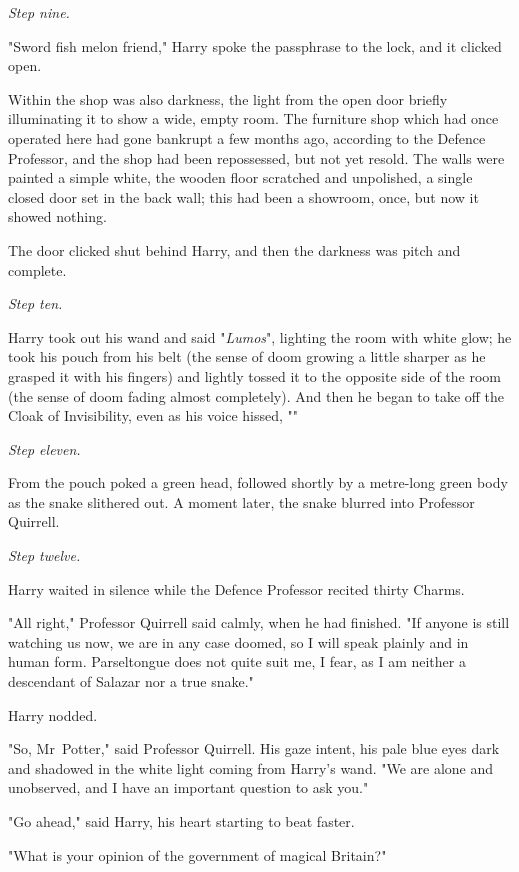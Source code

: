 \emph{Step nine.}

"Sword fish melon friend," Harry spoke the passphrase to the lock, and it
clicked open.

Within the shop was also darkness, the light from the open door briefly
illuminating it to show a wide, empty room. The furniture shop which had once
operated here had gone bankrupt a few months ago, according to the Defence
Professor, and the shop had been repossessed, but not yet resold. The walls
were painted a simple white, the wooden floor scratched and unpolished, a
single closed door set in the back wall; this had been a showroom, once, but
now it showed nothing.

The door clicked shut behind Harry, and then the darkness was pitch and
complete.

\emph{Step ten.}

Harry took out his wand and said "\emph{Lumos}", lighting the room with white
glow; he took his pouch from his belt (the sense of doom growing a little
sharper as he grasped it with his fingers) and lightly tossed it to the
opposite side of the room (the sense of doom fading almost completely). And
then he began to take off the Cloak of Invisibility, even as his voice hissed,
""

\emph{Step eleven.}

From the pouch poked a green head, followed shortly by a metre-long green body
as the snake slithered out. A moment later, the snake blurred into Professor
Quirrell.

\emph{Step twelve.}

Harry waited in silence while the Defence Professor recited thirty Charms.

"All right," Professor Quirrell said calmly, when he had finished. "If anyone
is still watching us now, we are in any case doomed, so I will speak plainly
and in human form. Parseltongue does not quite suit me, I fear, as I am neither
a descendant of Salazar nor a true snake."

Harry nodded.

"So, Mr~Potter," said Professor Quirrell. His gaze intent, his pale blue eyes
dark and shadowed in the white light coming from Harry’s wand. "We are alone
and unobserved, and I have an important question to ask you."

"Go ahead," said Harry, his heart starting to beat faster.

"What is your opinion of the government of magical Britain?"

